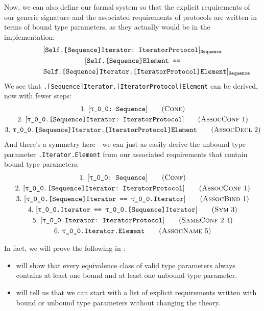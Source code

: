 \documentclass[../generics]{subfiles}
\begin{document}
\begin{example}
Now, we can also define our formal system so that the explicit requirements of our generic signature and the associated requirements of protocols are written in terms of bound type parameters, as they actually would be in the implementation:
\begin{gather*}
[\texttt{Self.[Sequence]Iterator:~IteratorProtocol}]_\texttt{Sequence}\\
[\texttt{Self.[Sequence]Element ==}\\
\qquad\qquad\texttt{Self.[Sequence]Iterator.[IteratorProtocol]Element}]_\texttt{Sequence}
\end{gather*}
We see that \texttt{\rT.[Sequence]Iterator.[IteratorProtocol]Element} can be derived, now with fewer steps:
\begin{gather*}
\ConfStep{\rT}{Sequence}{1}\\
\AssocConfStep{1}{\rT.[Sequence]Iterator}{IteratorProtocol}{2}\\
\AssocDeclStep{2}{\rT.[Sequence]Iterator.[IteratorProtocol]Element}{3}
\end{gather*}
And there's a symmetry here---we can just as easily derive the unbound type parameter \texttt{\rT.Iterator.Element} from our associated requirements that contain bound type parameters:
\begin{gather*}
\ConfStep{\rT}{Sequence}{1}\\
\AssocConfStep{1}{\rT.[Sequence]Iterator}{IteratorProtocol}{2}\\
\AssocBindStep{1}{\rT.[Sequence]Iterator}{\rT.Iterator}{3}\\
\SymStep{3}{\rT.Iterator}{\rT.[Sequence]Iterator}{4}\\
\SameConfStep{2}{4}{\rT.Iterator}{IteratorProtocol}{5}\\
\AssocNameStep{5}{\rT.Iterator.Element}{6}
\end{gather*}
\end{example}

In fact, we will prove the following in :
\begin{itemize}
\item {} will show that every equivalence class of valid type parameters always contains at least one bound and at least one unbound type parameter.
\item {} will tell us that we can start with a list of explicit requirements written with bound or unbound type parameters without changing the theory.
\end{itemize}
\end{document}
